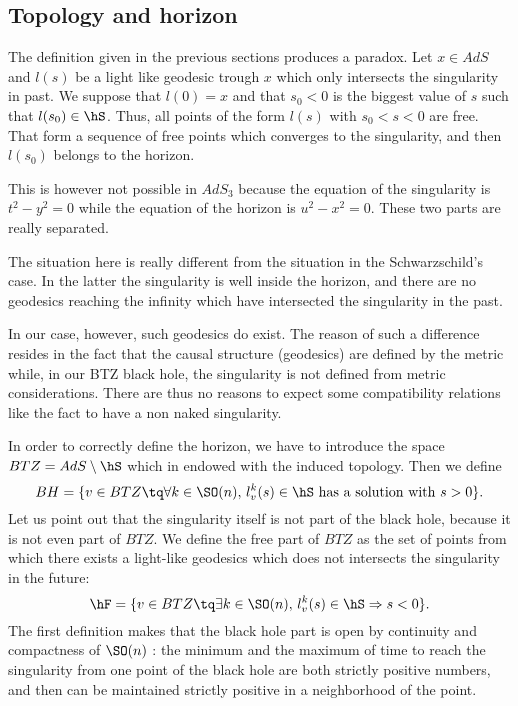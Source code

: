 \subsection{Topology and horizon}
\label{subSecTopoHor}

The definition given in the previous sections produces a paradox. Let $x\in AdS$ and $l(s)$ be a light like geodesic trough $x$ which only intersects the singularity in past. We suppose that $l(0)=x$ and that $s_0<0$ is the biggest value of $s$ such that $l(s_0)\in \hS$. Thus, all points of the form $l(s)$ with $s_0<s<0$ are free. That form a sequence of free points which converges to the singularity, and then $l(s_0)$ belongs to the horizon.

This is however not possible in $AdS_3$ because the equation of the singularity is $t^2-y^2=0$ while the equation of the horizon is $u^2-x^2=0$. These two parts are really separated. 

The situation here is really different from the situation in the Schwarzschild's case. In the latter the singularity is well inside the horizon, and there are no geodesics reaching the infinity which have intersected the singularity in the past.

In our case, however, such geodesics do exist. The reason of such a difference resides in the fact that the causal structure (geodesics) are defined by the metric while, in our BTZ black hole, the singularity is not defined from metric considerations. There are thus no reasons to expect some compatibility relations like the fact to have a non naked singularity.

In order to correctly define the horizon, we have to introduce the space $BTZ=AdS\setminus\hS$ which in endowed with the induced topology. Then we define
\begin{equation}
	BH=\{ v\in BTZ\tq\forall k\in \SO(n),\, l_v^k(s)\in\hS\text{ has a solution with }s>0 \}.
\end{equation}
Let us point out that the singularity itself is not part of the black hole, because it is not even part of $BTZ$. We define the free part of $BTZ$ as the set of points from which there exists a light-like geodesics which does not intersects the singularity in the future:
\begin{equation}
	\hF=\{ v\in BTZ\tq\exists k\in \SO(n),\, l_v^k(s)\in\hS\Rightarrow s<0 \}.
\end{equation}
The first definition makes that the black hole part is open by continuity and compactness of $\SO(n)$ : the minimum and the maximum of time to reach the singularity from one point of the black hole are both strictly positive numbers, and then can be maintained strictly positive in a neighborhood of the point.

